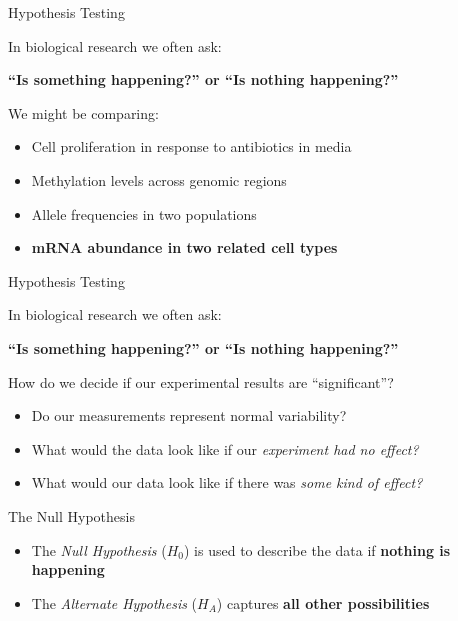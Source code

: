 \documentclass[aspectratio=169,11pt]{beamer}
\begin{document}
\begin{frame}{Hypothesis Testing}

In biological research we often ask:

	\begin{center}
	\textbf{“Is something happening?” or “Is nothing happening?”}
	\end{center}
	
	\pause

We might be comparing:

	\begin{itemize}
		\item Cell proliferation in response to antibiotics in media
		\item Methylation levels across genomic regions
		\item Allele frequencies in two populations
		\item \textbf{mRNA abundance in two related cell types}
	\end{itemize}

\end{frame}

\begin{frame}{Hypothesis Testing}

In biological research we often ask:

	\begin{center}
	\textbf{“Is something happening?” or “Is nothing happening?”}
	\end{center}

	How do we decide if our experimental results are “significant”?

	\begin{itemize}
		\item Do our measurements represent normal variability?
		\item What would the data look like if our \textit{experiment had no effect?}
		\item What would our data look like if there was \textit{some kind of effect?}
	\end{itemize}
	

\end{frame}

\begin{frame}{The Null Hypothesis}

	\begin{itemize}
		\item The \textit{Null Hypothesis} ($H_0$) is used to describe the data if \textbf{nothing is happening}
		\item The \textit{Alternate Hypothesis} ($H_A$) captures \textbf{all other possibilities}
	\end{itemize}


\end{frame}
\end{document}
